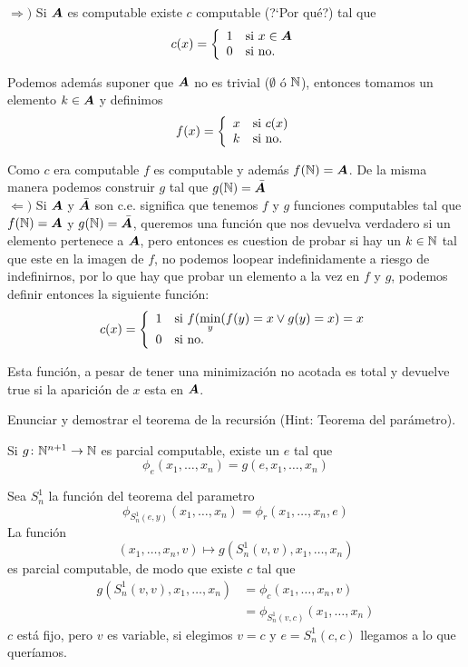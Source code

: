 \documentclass[leqno, 12pt, twoside,letterpaper]{book}
\begin{document}
\begin{solucion}

\begin{dem}
$\Rightarrow)$	Si $\bm{A}$ es computable existe $c$ computable (?`Por qué?) tal que
		\[ c(x) = \left\{ \begin{array}{ll} 1 & \mbox{si } x \in \bm{A} \\ 0 & \mbox{} \mbox{si no.} \end{array} \right. \]

		\noindent Podemos además suponer que $\bm{A}$ no es trivial ($\emptyset$ ó $\mathbb{N}$), entonces tomamos un elemento $k \in \bm{A}$ y definimos
		\[ f(x) = \left\{ \begin{array}{ll} x & \mbox{si } c(x) \\ k & \mbox{} \mbox{si no.} \end{array} \right. \]

	\noindent Como $c$ era computable $f$ es computable y además $f(\mathbb{N}) = \bm{A}$. De la misma manera podemos construir $g$ tal que $g(\mathbb{N}) = \bar{\bm{A}}$\\

	\noindent $\Leftarrow)$ Si $\bm{A}$ y $\bar{\bm{A}}$ son c.e. significa que tenemos $f$ y $g$ funciones computables tal que $f(\mathbb{N}) = \bm{A}$ y $g(\mathbb{N}) = \bar{\bm{A}}$, queremos una función que nos devuelva verdadero si un elemento pertenece a $\bm{A}$, pero entonces es cuestion de probar si hay un $k \in \mathbb{N}$ tal que este en la imagen de $f$, no podemos loopear indefinidamente a riesgo de indefinirnos, por lo que hay que probar un elemento a la vez en $f$ y $g$, podemos definir entonces la siguiente función:
	\[ c(x) = \left\{ \begin{array}{ll} 1 & \mbox{si } f(\min\limits_{y}(f(y) = x \lor g(y) = x) = x \\ 0 & \mbox{} \mbox{si no.} \end{array} \right. \]
\end{dem}

\noindent Esta función, a pesar de tener una minimización no acotada es total y devuelve true si la aparición de $x$ esta en $\bm{A}$.
\end{solucion}

\begin{ej}{2}
    Enunciar y demostrar el teorema de la recursión (Hint: Teorema del parámetro).
\end{ej}

\begin{solucion}
\begin{teo}{}
	Si $g \colon \mathbb{N}^{n + 1} \to \mathbb{N}$ es parcial computable, existe un $e$ tal que
	\[ \phi_e(x_1, \dots, x_n) = g(e, x_1, \dots, x_n)\]
\end{teo}

\begin{dem}
	Sea $S_n^1$ la función del teorema del parametro
	\[ \phi_{S_n^1(e, y)}(x_1, \dots, x_n) = \phi_r(x_1, \dots, x_n, e) \]
La función \[(x_1, \dots, x_n, v) \mapsto g(S_n^1(v, v), x_1, \dots, x_n)\]
es parcial computable, de modo que existe $c$ tal que
\begin{align*}
	g(S_n^1(v, v), x_1, \dots, x_n) &= \phi_c(x_1, \dots, x_n, v)\\
									&= \phi_{S_n^1(v, c)}(x_1, \dots, x_n)
\end{align*}
$c$ está fijo, pero $v$ es variable, si elegimos $v = c$ y $e = S_n^1(c, c)$ llegamos a lo que queríamos.

\end{dem}
\end{solucion}
\end{document}
